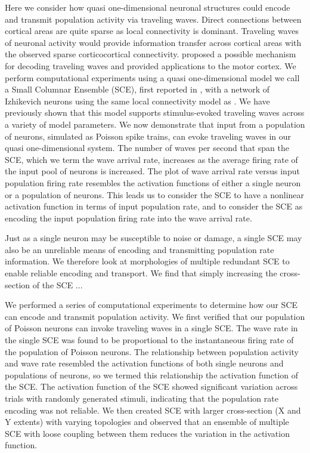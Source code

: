 Here we consider how quasi one-dimensional neuronal structures could encode and transmit population activity via traveling waves.
Direct connections between cortical areas are quite sparse\citep{Markov2011} as local connectivity is dominant.
Traveling waves of neuronal activity would provide information transfer across cortical areas with the observed sparse corticocortical connectivity.
\citet{Heitmann2013} proposed a possible mechanism for decoding traveling waves and provided applications to the motor cortex.
We perform computational experiments using a quasi one-dimensional model we call a Small Columnar Ensemble (SCE), first reported in , with a network of Izhikevich neurons \citep{izhikevich2003} using the same local connectivity model as \citep{maass2002}.
We have previously shown that this model supports stimulus-evoked traveling waves across a variety of model parameters.
We now demonstrate that input from a population of neurons, simulated as Poisson spike trains, can evoke traveling waves in our quasi one-dimensional system.
The number of waves per second that span the SCE, which we term the wave arrival rate, increases as the average firing rate of the input pool of neurons is increased.
The plot of wave arrival rate versus input population firing rate resembles the activation functions of either a single neuron or a population of neurons.
This leads us to consider the SCE to have a nonlinear activation function in terms of input population rate, and to consider the SCE as encoding the input population firing rate into the wave arrival rate.

Just as a single neuron may be susceptible to noise or damage, a single SCE may also be an unreliable means of encoding and transmitting population rate information.
We therefore look at morphologies of multiple redundant SCE to enable reliable encoding and transport.
We find that simply increasing the cross-section of the SCE ...

We performed a series of computational experiments to determine how our SCE can encode and transmit population activity.
We first verified that our population of Poisson neurons can invoke traveling waves in a single SCE.
The wave rate in the single SCE was found to be proportional to the instantaneous firing rate of the population of Poisson neurons.
The relationship between population activity and wave rate resembled the activation functions of both single neurons and populations of neurons, so we termed this relationship the activation function of the SCE.
The activation function of the SCE showed significant variation across trials with randomly generated stimuli, indicating that the population rate encoding was not reliable.
We then created SCE with larger cross-section (X and Y extents) with varying topologies and observed that an ensemble of multiple SCE with loose coupling between them reduces the variation in the activation function.

